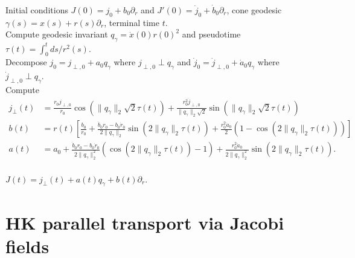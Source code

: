 \documentclass{article}
\begin{document}
\begin{algorithm}[H]
    \begin{algorithmic}[1]
        \caption{Jacobi field on $\mathfrak{C}(\mathbb{R}^d)$}
        \label{alg: jacobi field}
        \Require Initial conditions $J(0) = j_0 + b_0\partial_r$ and $J'(0) = \dot j_0 + \dot b_0 \partial_r$, cone geodesic $\gamma(s) = x(s) + r(s)\partial_r$, terminal time $t$.\\
        Compute geodesic invariant $q_\gamma = \dot x(0)r(0)^2$ and pseudotime $\tau(t) = \int_0^tds/r^2(s)$. \\
        Decompose $j_0 = j_{\perp, 0} + a_0q_{\gamma}$ where $j_{\perp, 0} \perp q_{\gamma}$ and $\dot j_0 = \dot j_{\perp, 0} + \dot a_0q_{\gamma}$ where $\dot j_{\perp, 0} \perp q_{\gamma}$.\\
        Compute 
        \begin{align*}
        j_{\perp}(t) &= \frac{r_0j_{\perp,0}}{r_0}\cos(\|q_{\gamma}\|_2\sqrt{2}\tau(t)) + \frac{r_0^2\dot j_{\perp, 0}}{\|q_{\gamma}\|_2\sqrt{2}}\sin(\|q_{\gamma}\|_2\sqrt{2}\tau(t)) \\
        b(t) &= r(t)\left[\frac{b_0}{r_0} + \frac{\dot b_0r_0 - b_0\dot r_0}{2\|q_{\gamma}\|_2}\sin(2\|q_{\gamma}\|_2\tau(t)) + \frac{r_0^2\dot a_0}{2} (1- \cos(2\|q_{\gamma}\|_2\tau(t)))\right] \\
        a(t) &= a_0 + \frac{\dot b_0r_0 - b_0\dot r_0}{2\|q_{\gamma}\|_2^2}(\cos(2\|q_{\gamma}\|_2\tau(t))-1) + \frac{r_0^2\dot a_0}{2\|q_{\gamma}\|_2^2}\sin(2\|q_{\gamma}\|_2\tau(t)).
        \end{align*}
        \\ \Return $J(t) = j_{\perp}(t) + a(t)q_{\gamma} + b(t)\partial_r$.
    \end{algorithmic}
\end{algorithm}

\section{HK parallel transport via Jacobi fields}
\end{document}
